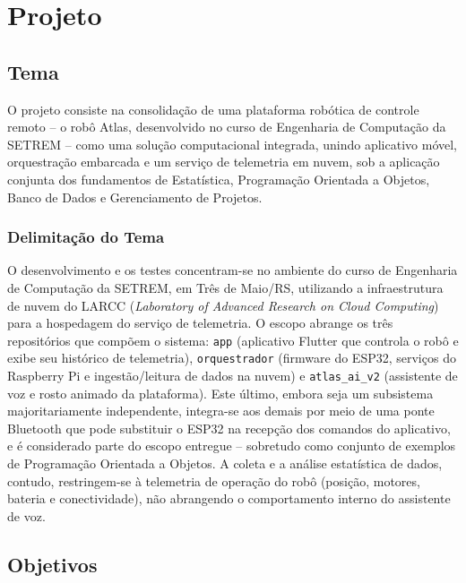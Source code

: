\chapter{Projeto} \label{chap:ResearchPlan}

\section{Tema} \label{sec:Theme}
O projeto consiste na consolidação de uma plataforma robótica de controle remoto -- o robô Atlas, desenvolvido no curso de Engenharia de Computação da SETREM -- como uma solução computacional integrada, unindo aplicativo móvel, orquestração embarcada e um serviço de telemetria em nuvem, sob a aplicação conjunta dos fundamentos de Estatística, Programação Orientada a Objetos, Banco de Dados e Gerenciamento de Projetos.

\subsection{Delimitação do Tema} \label{subsec:ThemeDelimitation}
O desenvolvimento e os testes concentram-se no ambiente do curso de Engenharia de Computação da SETREM, em Três de Maio/RS, utilizando a infraestrutura de nuvem do LARCC (\textit{Laboratory of Advanced Research on Cloud Computing}) para a hospedagem do serviço de telemetria. O escopo abrange os três repositórios que compõem o sistema: \texttt{app} (aplicativo Flutter que controla o robô e exibe seu histórico de telemetria), \texttt{orquestrador} (firmware do ESP32, serviços do Raspberry Pi e ingestão/leitura de dados na nuvem) e \texttt{atlas\_ai\_v2} (assistente de voz e rosto animado da plataforma). Este último, embora seja um subsistema majoritariamente independente, integra-se aos demais por meio de uma ponte Bluetooth que pode substituir o ESP32 na recepção dos comandos do aplicativo, e é considerado parte do escopo entregue -- sobretudo como conjunto de exemplos de Programação Orientada a Objetos. A coleta e a análise estatística de dados, contudo, restringem-se à telemetria de operação do robô (posição, motores, bateria e conectividade), não abrangendo o comportamento interno do assistente de voz.

\section{Objetivos} \label{sec:objectives}


